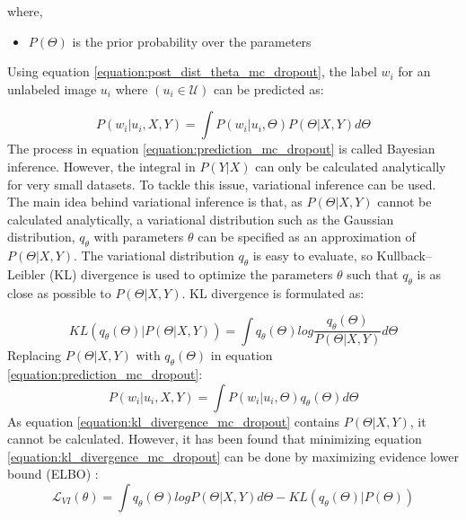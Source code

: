 where,
\begin{itemize}[label={}]
  \setlength\itemsep{0em}
  \item $P (\Theta)$ is the prior probability over the parameters
\end{itemize}
Using equation \ref{equation:post_dist_theta_mc_dropout}, the label $w_i$ for an unlabeled image $u_i$ where $(u_i\in\mathcal{U})$ can be predicted as:

\begin{equation}
    \label{equation:prediction_mc_dropout}
    P(w_i | u_i, X, Y) = \int P(w_i|u_i, \Theta)P(\Theta|X, Y)d\Theta
\end{equation}
The process in equation \ref{equation:prediction_mc_dropout} is called Bayesian inference. However, the integral in $P(Y|X)$ can only be calculated analytically for very small datasets. To tackle this issue, variational inference can be used. \\
The main idea behind variational inference is that, as $P(\Theta | X, Y)$ cannot be calculated analytically, a variational distribution such as the Gaussian distribution, $q_\theta$ with parameters $\theta$ can be specified as an approximation of $P(\Theta | X, Y)$. The variational distribution $q_\theta$ is easy to evaluate, so Kullback–Leibler (KL) divergence \cite{kullback1951} is used to optimize the parameters $\theta$ such that $q_\theta$ is as close as possible to $P(\Theta | X, Y)$. KL divergence is formulated as:

\begin{equation}
    \label{equation:kl_divergence_mc_dropout}
    KL(q_\theta(\Theta)|P(\Theta| X, Y)) = \int{q_\theta(\Theta)log\frac{q_\theta(\Theta)}{P(\Theta| X, Y)}d\Theta}
\end{equation}
Replacing $P(\Theta| X, Y)$ with $q_\theta(\Theta)$ in equation \ref{equation:prediction_mc_dropout}:
\begin{equation}
    \label{equation:prediction_replaced_mc_dropout}
    P(w_i | u_i, X, Y) = \int P(w_i|u_i, \Theta)q_\theta(\Theta)d\Theta
\end{equation}
As equation \ref{equation:kl_divergence_mc_dropout} contains $P(\Theta| X, Y)$, it cannot be calculated. However, it has been found that minimizing equation \ref{equation:kl_divergence_mc_dropout} can be done by maximizing evidence lower bound (ELBO) \cite{bishop2006}:
\begin{equation}
    \label{equation:evidence_lower_bound_mc_dropout}
    \mathcal{L}_{VI}(\theta) = \int{q_\theta(\Theta)logP(\Theta| X, Y)d\Theta - KL(q_\theta(\Theta)|P(\Theta))}
\end{equation}

